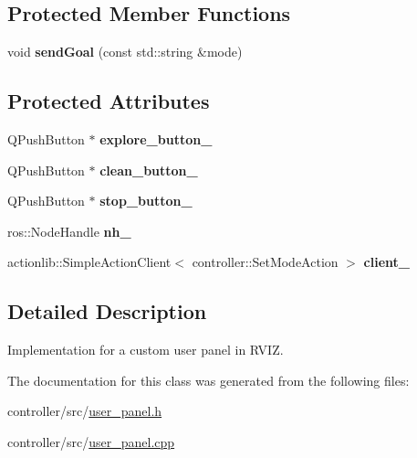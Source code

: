 \subsection*{Protected Member Functions}
\begin{DoxyCompactItemize}
\item 
\mbox{\label{classcleanup_1_1_user_panel_a02f7e7b8a4e28ffb92f1acb79087079e}} 
void {\bfseries send\+Goal} (const std\+::string \&mode)
\end{DoxyCompactItemize}
\subsection*{Protected Attributes}
\begin{DoxyCompactItemize}
\item 
\mbox{\label{classcleanup_1_1_user_panel_a718b588057cc72b9edbfc1f9c2f0c084}} 
Q\+Push\+Button $\ast$ {\bfseries explore\+\_\+button\+\_\+}
\item 
\mbox{\label{classcleanup_1_1_user_panel_a898a0f77d79438ee266e119303613606}} 
Q\+Push\+Button $\ast$ {\bfseries clean\+\_\+button\+\_\+}
\item 
\mbox{\label{classcleanup_1_1_user_panel_a9cb1f405edd75371c1a14a5dcd4fa038}} 
Q\+Push\+Button $\ast$ {\bfseries stop\+\_\+button\+\_\+}
\item 
\mbox{\label{classcleanup_1_1_user_panel_aa4b3efececbc9296c40f180e94dee7c7}} 
ros\+::\+Node\+Handle {\bfseries nh\+\_\+}
\item 
\mbox{\label{classcleanup_1_1_user_panel_a09cc36d63b054e7dd0a849de9d921be8}} 
actionlib\+::\+Simple\+Action\+Client$<$ controller\+::\+Set\+Mode\+Action $>$ {\bfseries client\+\_\+}
\end{DoxyCompactItemize}


\subsection{Detailed Description}
Implementation for a custom user panel in R\+V\+IZ. 

The documentation for this class was generated from the following files\+:\begin{DoxyCompactItemize}
\item 
controller/src/\hyperlink{user__panel_8h}{user\+\_\+panel.\+h}\item 
controller/src/\hyperlink{user__panel_8cpp}{user\+\_\+panel.\+cpp}\end{DoxyCompactItemize}
